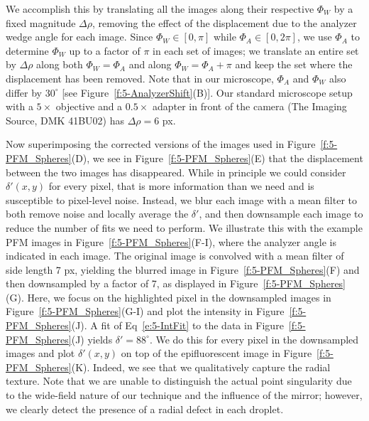 We accomplish this by translating all the images along their respective $\Phi_W$ by a fixed magnitude $\Delta \rho$, removing the effect of the displacement due to the analyzer wedge angle for each image.
Since $\Phi_W \in [0,\pi]$ while $\Phi_A \in [0, 2 \pi]$, we use $\Phi_A$ to determine $\Phi_W$ up to a factor of $\pi$ in each set of images; we translate an entire set by $\Delta \rho$ along both $\Phi_W = \Phi_A$ and along $\Phi_W = \Phi_A + \pi$ and keep the set where the displacement has been removed.
Note that in our microscope, $\Phi_A$ and $\Phi_W$ also differ by $30^{\circ}$ [see Figure~\ref{f:5-AnalyzerShift}(B)].
Our standard microscope setup with a $5\times$ objective and a $0.5 \times$ adapter in front of the camera (The Imaging Source, DMK 41BU02) has $\Delta \rho = 6$ px.

Now superimposing the corrected versions of the images used in Figure~\ref{f:5-PFM_Spheres}(D), we see in Figure~\ref{f:5-PFM_Spheres}(E) that the displacement between the two images has disappeared.
While in principle we could consider $\delta'(x,y)$ for every pixel, that is more information than we need and is susceptible to pixel-level noise.
Instead, we blur each image with a mean filter to both remove noise and locally average the $\delta'$, and then downsample each image to reduce the number of fits we need to perform.
We illustrate this with the example PFM images in Figure~\ref{f:5-PFM_Spheres}(F-I), where the analyzer angle is indicated in each image.
The original image is convolved with a mean filter of side length 7 px, yielding the blurred image in Figure~\ref{f:5-PFM_Spheres}(F) and then downsampled by a factor of 7, as displayed in Figure~\ref{f:5-PFM_Spheres}(G).
Here, we focus on the highlighted pixel in the downsampled images in Figure~\ref{f:5-PFM_Spheres}(G-I) and plot the intensity in Figure~\ref{f:5-PFM_Spheres}(J).
A fit of Eq~\ref{e:5-IntFit} to the data in Figure~\ref{f:5-PFM_Spheres}(J) yields $\delta' = 88^{\circ}$.
We do this for every pixel in the downsampled images and plot $\delta'(x,y)$ on top of the epifluorescent image in Figure~\ref{f:5-PFM_Spheres}(K).
Indeed, we see that we qualitatively capture the radial texture.
Note that we are unable to distinguish the actual point singularity due to the wide-field nature of our technique and the influence of the mirror; however, we clearly detect the presence of a radial defect in each droplet.
